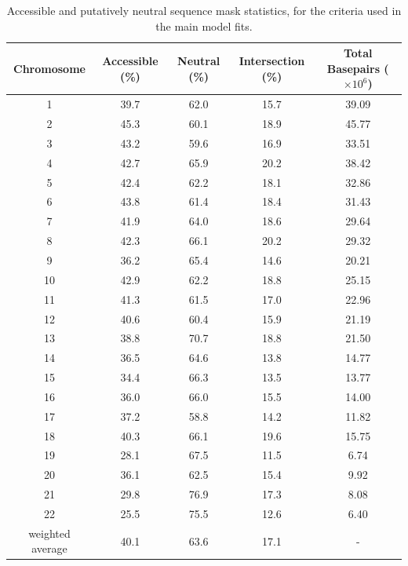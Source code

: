 \documentclass[11pt]{article}
\begin{document}
\begin{table}
    \label{supp-table:masks}
\centering
\caption{Accessible and putatively neutral sequence mask statistics, for the criteria used in 
         the main model fits.}
\begin{tabular}{|c|cccc|}
\hline
Chromosome & Accessible (\%) & Neutral (\%) & Intersection (\%) & Total Basepairs ($\times 10^6$) \\
\hline 
1 &        39.7 &     62.0 &  15.7 &     39.09 \\
2 &        45.3 &     60.1 &  18.9 &     45.77 \\
3 &        43.2 &     59.6 &  16.9 &     33.51 \\
4 &        42.7 &     65.9 &  20.2 &     38.42 \\
5 &        42.4 &     62.2 &  18.1 &     32.86 \\
6 &        43.8 &     61.4 &  18.4 &     31.43 \\
7 &        41.9 &     64.0 &  18.6 &     29.64 \\
8 &        42.3 &     66.1 &  20.2 &     29.32 \\
9 &        36.2 &     65.4 &  14.6 &     20.21 \\
10 &        42.9 &     62.2 &  18.8 &     25.15 \\
11 &        41.3 &     61.5 &  17.0 &     22.96 \\
12 &        40.6 &     60.4 &  15.9 &     21.19 \\
13 &        38.8 &     70.7 &  18.8 &     21.50 \\
14 &        36.5 &     64.6 &  13.8 &     14.77 \\
15 &        34.4 &     66.3 &  13.5 &     13.77 \\
16 &        36.0 &     66.0 &  15.5 &     14.00 \\
17 &        37.2 &     58.8 &  14.2 &     11.82 \\
18 &        40.3 &     66.1 &  19.6 &     15.75 \\
19 &        28.1 &     67.5 &  11.5 &      6.74 \\
20 &        36.1 &     62.5 &  15.4 &      9.92 \\
21 &        29.8 &     76.9 &  17.3 &      8.08 \\
22 &        25.5 &     75.5 &  12.6 &      6.40 \\
\hline
weighted average & 40.1 & 63.6 & 17.1 & - \\
\hline
\end{tabular}
\end{table}
\end{document}
